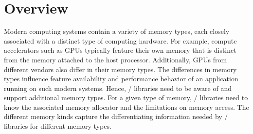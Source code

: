 \renewcommand{\Color}[1]{}

\newenvironment{etabular}
  {\edtable{tabular}}
  {\endedtable}

\newcommand{\semanticstwo}[2]
{
\Color{green}
\begin{etabular}{l|l}
\hspace*{0.1cm} & #1 \\
& #2\\
\end{etabular}
\vspace*{0.2cm}
\Color{black}
}

\newcommand{\semanticsthree}[3]
{
\Color{green}
\begin{etabular}{l|l}
\hspace*{0.1cm} & #1 \\
& #2\\
& #3\\
\end{etabular}
\vspace*{0.2cm}
\Color{black}
}

\newcommand{\semanticsfour}[4]
{
\Color{green}
\begin{etabular}{l|l}
\hspace*{0.1cm} & #1 \\
& #2\\
& #3\\
& #4\\
\end{etabular}
\vspace*{0.2cm}
\Color{black}
}

\chapter{Overview}
\label{chap:overview}

Modern computing systems contain a variety of memory types, each
closely associated with a distinct type of computing hardware. For
example, compute accelerators such as GPUs typically feature their
own memory that is distinct from the memory attached to the host
processor. Additionally, GPUs from different vendors also differ
in their memory types. The differences in memory types influence
feature availability and performance behavior of an application
running on such modern systems. Hence, \mpi/ libraries need to be
aware of and support additional memory types. For a given type of
memory, \mpi/ libraries need to know the associated memory allocator and
the limitations on memory access. The different memory kinds capture
the differentiating information needed by \mpi/ libraries for different
memory types.

